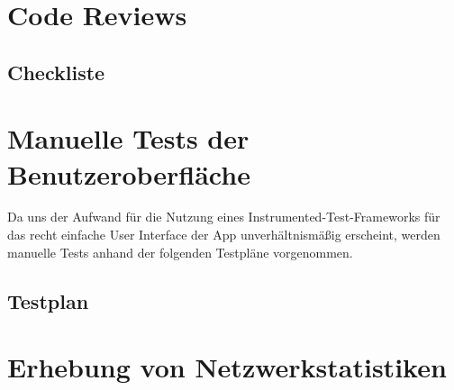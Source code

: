 



\clearpage


\section{Code Reviews}


\subsection{Checkliste}






\clearpage

\section{Manuelle Tests der Benutzeroberfläche}

Da uns der Aufwand für die Nutzung eines Instrumented-Test-Frameworks
für das recht einfache User Interface der App unverhältnismäßig
erscheint, werden manuelle Tests anhand der folgenden Testpläne
vorgenommen.

\subsection{Testplan}





\clearpage
\section{Erhebung von Netzwerkstatistiken}

